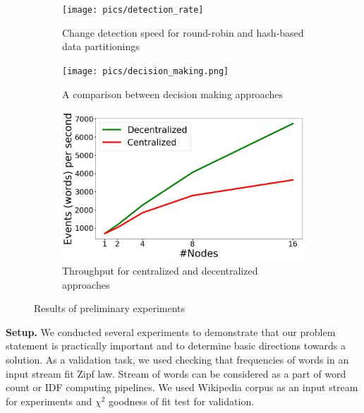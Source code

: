 \label {fs-short-experiments}

\begin{figure}[t!]
    \begin{subfigure}[b]{0.31\textwidth}
            \texttt{[image: pics/detection\_rate]}
            \caption{Change detection speed for round-robin and hash-based data partitionings}
            \label{detection_rate}
    \end{subfigure}%
    \hspace{5mm}
    \begin{subfigure}[b]{0.31\textwidth}
            \texttt{[image: pics/decision\_making.png]}
            \caption{A comparison between decision making approaches}
            \label{decision_making}
    \end{subfigure}%
    \hspace{5mm}
    \begin{subfigure}[b]{0.31\textwidth}
            \includegraphics[width=\linewidth]{pics/throughput}
            \caption{Throughput for centralized and decentralized approaches}
            \label{throughput}
    \end{subfigure}%
    \caption{Results of preliminary experiments}
\end{figure}


\indent

{\bf Setup.} We conducted several experiments to demonstrate that our problem statement is practically important and to determine basic directions towards a solution. As a validation task, we used checking that frequencies of words in an input stream fit Zipf law. Stream of words can be considered as a part of word count or IDF computing pipelines. We used Wikipedia corpus as an input stream for experiments and $\chi^{2}$ goodness of fit test for validation.

